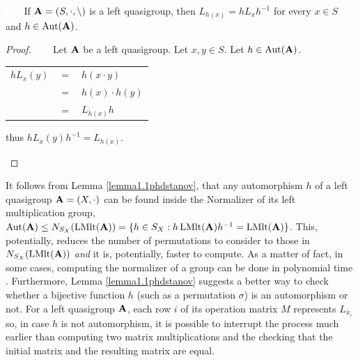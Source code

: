 \begin{lemma}\label{lemma1.1phdstanov}\textcolor{white}{line}\newline
If $\mathbf{A}=(S,\cdot, \backslash)$ is a left quasigroup, then $L_{h(x)} = hL_xh^{-1}$ for every $x \in S$ and $h\in \operatorname{Aut}(\mathbf{A})$. 
\begin{proof}\textcolor{white}{line}\newline
Let $\mathbf{A}$ be a left quasigroup. Let $x,y\in S$. Let $h \in \operatorname{Aut}(\mathbf{A})$. 
\begin{center}
    \begin{tabular}{ccl}
        $hL_x(y)$ & $=$ & $h(x \cdot y)$\\
                          & $=$ & $h(x) \cdot h(y)$\\
                          & $=$ & $L_{h(x)}h$\\
\end{tabular}
 thus $hL_x(y)h^{-1}= L_{h(x)}$.
\end{center}
\end{proof}
\end{lemma}
\noindent It follows from Lemma \ref{lemma1.1phdstanov}, that any automorphism $h$ of a left quasigroup $\mathbf{A} = (X, \cdot)$ can be found inside the Normalizer of its left multiplication group,  $\operatorname{Aut}(\mathbf{A}) \leq N_{S_X}(\operatorname{LMlt}(\mathbf{A})) = \{ h \in S_X : h\operatorname{LMlt}(\mathbf{A})h^{-1} = \operatorname{LMlt}(\mathbf{A})\}$. \newline This, potentially, reduces the number of permutations to consider to those in \newline $N_{S_X}(\operatorname{LMlt}(\mathbf{A}))$ \emph{and} it is, potentially, faster to compute. As a matter of fact, in some cases, computing the normalizer of a group can be done in polynomial time \cite{holt2005handbook}.\newline
Furthermore, Lemma \ref{lemma1.1phdstanov} suggests a better way to check whether a bijective function $h$ (such as a permutation $\sigma$) is an automorphism or not. For a left quasigroup $\mathbf{A}$, each row $i$ of its operation matrix $M$ represents $L_{x_i}$ so, in case $h$ is not automorphism, it is possible to interrupt the process much earlier than computing two matrix multiplications and the checking that the initial matrix and the resulting matrix are equal.\newline

